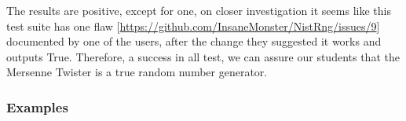 The results are positive, except for one, on closer investigation it seems like this test suite has one flaw [\href{https://github.com/InsaneMonster/NistRng/issues/9}{https://github.com/InsaneMonster/NistRng/issues/9}] documented by one of the users, after the change they suggested it works and outputs True. Therefore, a success in all test, we can assure our students that the Mersenne Twister is a true random number generator.

\subsubsection{Examples}
	
